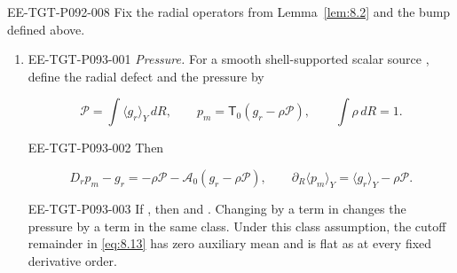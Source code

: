 \begin{proposition}\label{prop:8.3}
\begin{EESegment}{EE-TGT-P092-008}
Fix the radial operators from Lemma~\ref{lem:8.2} and the bump
 defined above.
%
\end{EESegment}
\begin{enumerate}[label=(\roman*)]
\item
\begin{EESegment}{EE-TGT-P093-001}
\emph{Pressure.} For a smooth shell-supported scalar source
, define the radial defect
 and the pressure  by
\end{EESegment}
\begin{equation}
\mathcal P=\int\langle g_r\rangle_Y\,dR,
\qquad p_m=\mathsf T_0(g_r-\rho\mathcal P),
\qquad \int\rho\,dR=1.
\tag{8.12}\label{eq:8.12}
\end{equation}
\begin{EESegment}{EE-TGT-P093-002}
Then
\end{EESegment}
\begin{equation}
D_rp_m-g_r=-\rho\mathcal P-\mathcal A_0(g_r-\rho\mathcal P),
\qquad \partial_R\langle p_m\rangle_Y=\langle g_r\rangle_Y-\rho\mathcal P.
\tag{8.13}\label{eq:8.13}
\end{equation}
\begin{EESegment}{EE-TGT-P093-003}
If , then
 and
. Changing  by a term
in  changes the pressure by a term in the same class. Under
this class assumption, the cutoff remainder in \eqref{eq:8.13} has zero auxiliary mean and is flat
as  at every fixed derivative order.
\end{EESegment}


\end{enumerate}
\end{proposition}
